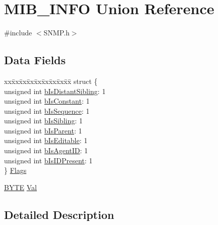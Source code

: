 \hypertarget{union_m_i_b___i_n_f_o}{}\section{M\+I\+B\+\_\+\+I\+N\+F\+O Union Reference}
\label{union_m_i_b___i_n_f_o}


{\ttfamily \#include $<$S\+N\+M\+P.\+h$>$}

\subsection*{Data Fields}
\begin{DoxyCompactItemize}
\item 
\begin{tabbing}
xx\=xx\=xx\=xx\=xx\=xx\=xx\=xx\=xx\=\kill
struct \{\\
\>unsigned int \hyperlink{union_m_i_b___i_n_f_o_aa92c1d5f9f2904a36e2f475a3ef5bae1}{bIsDistantSibling}: 1\\
\>unsigned int \hyperlink{union_m_i_b___i_n_f_o_a8379610ced9f0ff89ef3223c84c4ce1c}{bIsConstant}: 1\\
\>unsigned int \hyperlink{union_m_i_b___i_n_f_o_a0eb5bfcecf84a00f348bf4037101eb51}{bIsSequence}: 1\\
\>unsigned int \hyperlink{union_m_i_b___i_n_f_o_a37566bc1a68f219e1d37f7c6aaf23e2f}{bIsSibling}: 1\\
\>unsigned int \hyperlink{union_m_i_b___i_n_f_o_a39ea762ddcb8685bbad8cdbb629bb751}{bIsParent}: 1\\
\>unsigned int \hyperlink{union_m_i_b___i_n_f_o_a3261ab7b8974248ac32503f93ba0825c}{bIsEditable}: 1\\
\>unsigned int \hyperlink{union_m_i_b___i_n_f_o_a695f706b73d78549556f5385b050f011}{bIsAgentID}: 1\\
\>unsigned int \hyperlink{union_m_i_b___i_n_f_o_a5fd8230be007a0d68d207392f84b8ef0}{bIsIDPresent}: 1\\
\} \hyperlink{union_m_i_b___i_n_f_o_a6aa8396e7b592abeac512b3cd0655303}{Flags}\\

\end{tabbing}\item 
\hyperlink{_generic_type_defs_8h_a4ae1dab0fb4b072a66584546209e7d58}{B\+Y\+T\+E} \hyperlink{union_m_i_b___i_n_f_o_a5ab8c2bf45b20b5f7aa3a4f083896cec}{Val}
\end{DoxyCompactItemize}


\subsection{Detailed Description}


